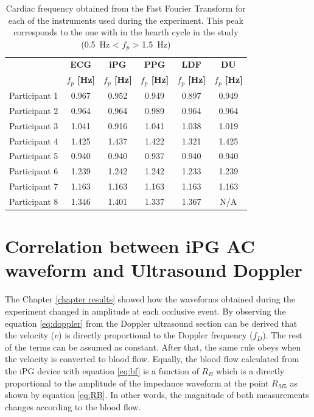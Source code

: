 \begin{table}[!htbp]
	\caption[Peak frequency calculated obtained form Fast Fourier Transform]{Cardiac frequency obtained from the Fast Fourier Transform for each of the instruments used during the experiment. This peak corresponds to the one with in the hearth cycle in the study (\SI{0.5}{\hertz} < $f_p$ > \SI{1.5}{\hertz})}
	\label{tbl:fft}
	\centering 
	\begin{tabular}{lccccc}
		\toprule
		& \textbf{ECG}
		& \textbf{iPG}
		& \textbf{PPG}
		& \textbf{LDF}
		& \textbf{DU} \\
		& \textbf{$f_p$ [\si{\hertz}]}		
		& \textbf{$f_p$ [\si{\hertz}]}		
		& \textbf{$f_p$ [\si{\hertz}]}
		& \textbf{$f_p$ [\si{\hertz}]}
		& \textbf{$f_p$ [\si{\hertz}]}\\\midrule
	    Participant 1    &     0.967    &     0.952    &     0.949    &     0.897    &     0.949    \\  
		Participant 2    &     0.964    &     0.964    &     0.989    &     0.964    &     0.964    \\  
		Participant 3    &     1.041    &     0.916    &     1.041    &     1.038    &     1.019    \\  
		Participant 4    &     1.425    &     1.437    &     1.422    &     1.321    &     1.425    \\  
		Participant 5    &     0.940    &     0.940    &     0.937    &     0.940    &     0.940    \\  
		Participant 6    &     1.239    &     1.242    &     1.242    &     1.233    &     1.239    \\  
		Participant 7    &     1.163    &     1.163    &     1.163    &     1.163    &     1.163    \\  
		Participant 8    &     1.346    &     1.401    &     1.337    &     1.367    &     N/A    \\  
 
	\bottomrule
	\end{tabular}
\end{table}


\section{Correlation between iPG AC waveform and Ultrasound Doppler} %
\label{section correlation 2} 
The Chapter  \ref{chapter results} showed how the waveforms obtained during the experiment changed in amplitude at each occlusive event. By observing the equation \ref{eq:doppler}  from the Doppler ultrasound section can be derived that the velocity ($v$) is directly proportional to the Doppler frequency ($f_D$). The rest of the terms can be assumed as constant. After that, the same rule obeys when the velocity is converted to blood flow. Equally, the blood flow calculated from the iPG device with equation \ref{eq:bf} is a function of $R_B$ which is a directly proportional to the amplitude of the impedance waveform at the point $R_{M5}$ as shown by equation \ref{eq:RB}. In other words, the magnitude of both measurements changes according to the blood flow.

